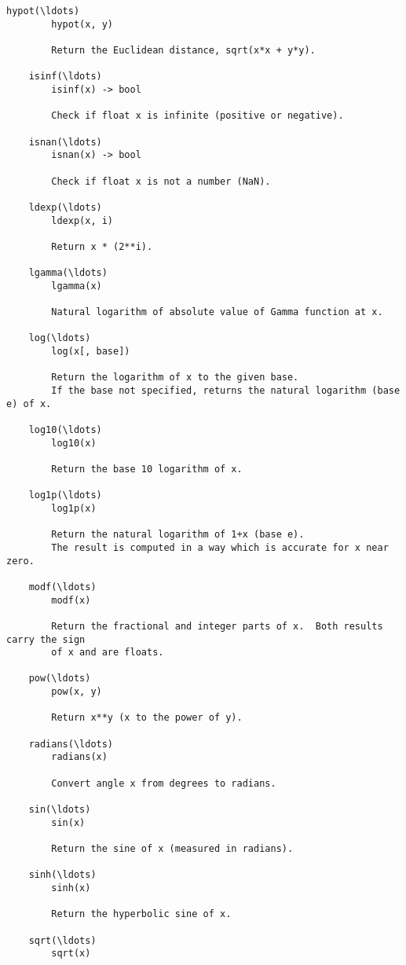 \documentclass{article}
\begin{document}
\begin{Verbatim}[commandchars=\\\{\}]
    hypot(\ldots)
        hypot(x, y)
        
        Return the Euclidean distance, sqrt(x*x + y*y).
    
    isinf(\ldots)
        isinf(x) -> bool
        
        Check if float x is infinite (positive or negative).
    
    isnan(\ldots)
        isnan(x) -> bool
        
        Check if float x is not a number (NaN).
    
    ldexp(\ldots)
        ldexp(x, i)
        
        Return x * (2**i).
    
    lgamma(\ldots)
        lgamma(x)
        
        Natural logarithm of absolute value of Gamma function at x.
    
    log(\ldots)
        log(x[, base])
        
        Return the logarithm of x to the given base.
        If the base not specified, returns the natural logarithm (base e) of x.
    
    log10(\ldots)
        log10(x)
        
        Return the base 10 logarithm of x.
    
    log1p(\ldots)
        log1p(x)
        
        Return the natural logarithm of 1+x (base e).
        The result is computed in a way which is accurate for x near zero.
    
    modf(\ldots)
        modf(x)
        
        Return the fractional and integer parts of x.  Both results carry the sign
        of x and are floats.
    
    pow(\ldots)
        pow(x, y)
        
        Return x**y (x to the power of y).
    
    radians(\ldots)
        radians(x)
        
        Convert angle x from degrees to radians.
    
    sin(\ldots)
        sin(x)
        
        Return the sine of x (measured in radians).
    
    sinh(\ldots)
        sinh(x)
        
        Return the hyperbolic sine of x.
    
    sqrt(\ldots)
        sqrt(x)
        

\end{Verbatim}
\end{document}
